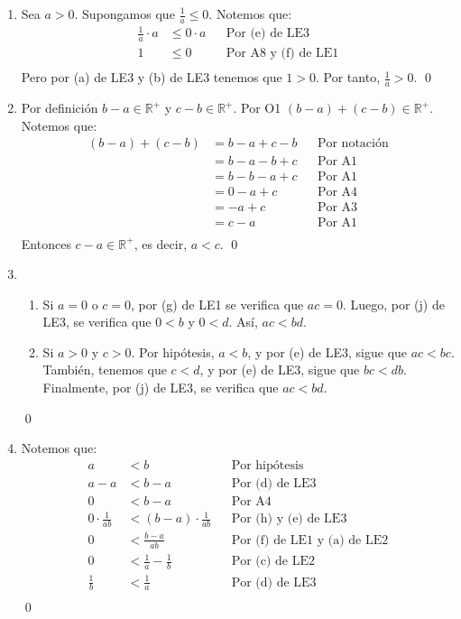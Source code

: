 \documentclass[11pt]{article}
\begin{document}
\begin{enumerate}[label=\alph*),font=\bfseries]

    \item Sea $a>0$. Supongamos que $\frac{1}{a} \leq 0$. Notemos que:
    \begin{align*}
        \frac{1}{a} \cdot a &\leq 0 \cdot a && \text{Por (e) de LE3}\\
        1 &\leq 0 && \text{Por A8 y (f) de LE1}\\
    \end{align*}
    Pero por (a) de LE3 y (b) de LE3 tenemos que $1>0$. Por tanto, $\frac{1}{a} > 0$.
    \qed


    \item Por definición $b-a \in \mathbb{R}^+$ y $c-b \in \mathbb{R}^+$. Por O1 $(b-a) + (c-b) \in \mathbb{R}^+$. Notemos que:
    \begin{align*}
        (b-a) + (c-b) &= b - a + c -b && \text{Por notación}\\
        &= b-a -b+c && \text{Por A1}\\
        &= b-b -a+c && \text{Por A1}\\
        &= 0 - a +c && \text{Por A4}\\
        &= -a +c && \text{Por A3}\\
        &= c-a && \text{Por A1}\\
    \end{align*}
    Entonces $c-a \in \mathbb{R}^+$, es decir, $a<c$.
    \qed


    \item 
    \begin{enumerate}[label=\roman*),font=\bfseries]
        \item Si $a=0$ o $c=0$, por (g) de LE1 se verifica que $ac=0$. Luego, por (j) de LE3, se verifica que $0<b$ y $0<d$. Así, $ac<bd$.
        \item Si $a>0$ y $c>0$. Por hipótesis, $a<b$, y por (e) de LE3, sigue que $ac<bc$. También, tenemos que $c<d$, y por (e) de LE3, sigue que $bc<db$. Finalmente, por (j) de LE3, se verifica que $ac<bd$.
    \end{enumerate}
    \qed


    \item Notemos que:
    \begin{align*}
    a &< b && \text{Por hipótesis} \\
    a-a &< b-a && \text{Por (d) de LE3} \\
    0 &< b-a && \text{Por A4} \\
    0 \cdot \frac{1}{ab} &< (b-a) \cdot \frac{1}{ab} && \text{Por (h) y (e) de LE3}\\
    0 &< \frac{b-a}{ab} && \text{Por (f) de LE1 y (a) de LE2}\\
    0 &< \frac{1}{a} - \frac{1}{b} && \text{Por (c) de LE2}\\
    \frac{1}{b} &< \frac{1}{a} && \text{Por (d) de LE3}\\
    \end{align*}
    \qed


\end{enumerate}
\end{document}
